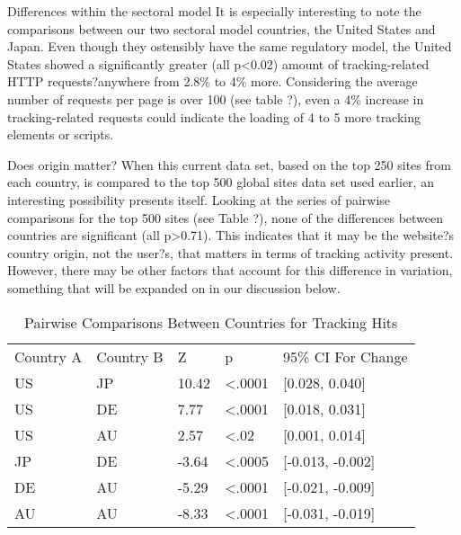 \documentclass[journal]{IEEEtran}
\begin{document}
Differences within the sectoral model
It is especially interesting to note the comparisons between our two sectoral model countries, the United States and Japan. Even though they ostensibly have the same regulatory model, the United States showed a significantly greater (all p<0.02) amount of tracking-related HTTP requests?anywhere from 2.8\% to 4\% more. Considering the average number of requests per page is over 100 (see table ?), even a 4\% increase in tracking-related requests could indicate the loading of 4 to 5 more tracking elements or scripts.

Does origin matter?
When this current data set, based on the top 250 sites from each country, is compared to the top 500 global sites data set used earlier, an interesting possibility presents itself. Looking at the series of pairwise comparisons for the top 500 sites (see Table ?), none of the differences between countries are significant (all p>0.71). This indicates that it may be the website?s country origin, not the user?s, that matters in terms of tracking activity present. However, there may be other factors that account for this difference in variation, something that will be expanded on in our discussion below.

\begin{table}[t]
\centering
\caption{Pairwise Comparisons Between Countries for Tracking Hits}
\label{pairwise}
\begin{tabular}{lllll}
Country A & Country B & Z     & p              & 95\% CI For Change   \\
US        & JP        & 10.42 & \textless.0001 & {[}0.028, 0.040{]}   \\
US        & DE        & 7.77  & \textless.0001 & {[}0.018, 0.031{]}   \\
US        & AU        & 2.57  & \textless.02   & {[}0.001, 0.014{]}   \\
JP        & DE        & -3.64 & \textless.0005 & {[}-0.013, -0.002{]} \\
DE        & AU        & -5.29 & \textless.0001 & {[}-0.021, -0.009{]} \\
AU        & AU        & -8.33 & \textless.0001 & {[}-0.031, -0.019{]}
\end{tabular}
\end{table}
\end{document}
